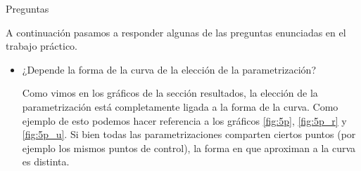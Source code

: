 \begin{section}{Preguntas}

A continuación pasamos a responder algunas de las preguntas enunciadas en el trabajo práctico.
\begin{itemize}
	\item ¿Depende la forma de la curva de la elección de la parametrización?
	
		Como vimos en los gráficos de la sección resultados, la elección de la parametrización está completamente ligada a la forma de la curva. Como ejemplo de esto podemos hacer referencia a los gráficos \ref{fig:5p}, \ref{fig:5p_r} y \ref{fig:5p_u}. Si bien todas las parametrizaciones comparten ciertos puntos (por ejemplo los mismos puntos de control), la forma en que aproximan a la curva es distinta.
\end{itemize}

\end{section}
